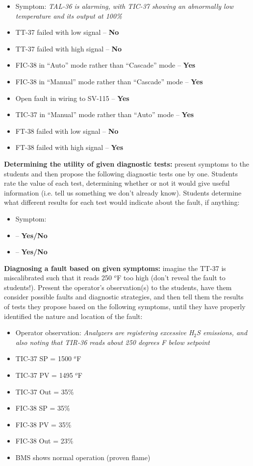 \begin{itemize}
\item{} Symptom: {\it TAL-36 is alarming, with TIC-37 showing an abnormally low temperature and its output at 100\%}
\item{} TT-37 failed with low signal -- {\bf No}
\item{} TT-37 failed with high signal -- {\bf No}
\item{} FIC-38 in ``Auto'' mode rather than ``Cascade'' mode -- {\bf Yes}
\item{} FIC-38 in ``Manual'' mode rather than ``Cascade'' mode -- {\bf Yes}
\item{} Open fault in wiring to SV-115 -- {\bf Yes}
\item{} TIC-37 in ``Manual'' mode rather than ``Auto'' mode -- {\bf Yes}
\item{} FT-38 failed with low signal -- {\bf No}
\item{} FT-38 failed with high signal -- {\bf Yes}
\end{itemize}


\vskip 10pt


\noindent
{\bf Determining the utility of given diagnostic tests:} present symptoms to the students and then propose the following diagnostic tests one by one.  Students rate the value of each test, determining whether or not it would give useful information (i.e. tell us something we don't already know).  Students determine what different results for each test would indicate about the fault, if anything:

\begin{itemize}
\item{} Symptom: {\it }
\item{}  -- {\bf Yes/No}
\item{}  -- {\bf Yes/No}
\end{itemize}


\vskip 10pt


\noindent
{\bf Diagnosing a fault based on given symptoms:} imagine the TT-37 is miscalibrated such that it reads 250 $^{o}$F too high (don't reveal the fault to students!).  Present the operator's observation(s) to the students, have them consider possible faults and diagnostic strategies, and then tell them the results of tests they propose based on the following symptoms, until they have properly identified the nature and location of the fault:

\begin{itemize}
\item{} Operator observation: {\it Analyzers are registering excessive H$_{2}$S emissions, and also noting that TIR-36 reads about 250 degrees F below setpoint}
\item{} TIC-37 SP = 1500 $^{o}$F
\item{} TIC-37 PV = 1495 $^{o}$F
\item{} TIC-37 Out = 35\%
\item{} FIC-38 SP = 35\%
\item{} FIC-38 PV = 35\%
\item{} FIC-38 Out = 23\%
\item{} BMS shows normal operation (proven flame)
\end{itemize}




